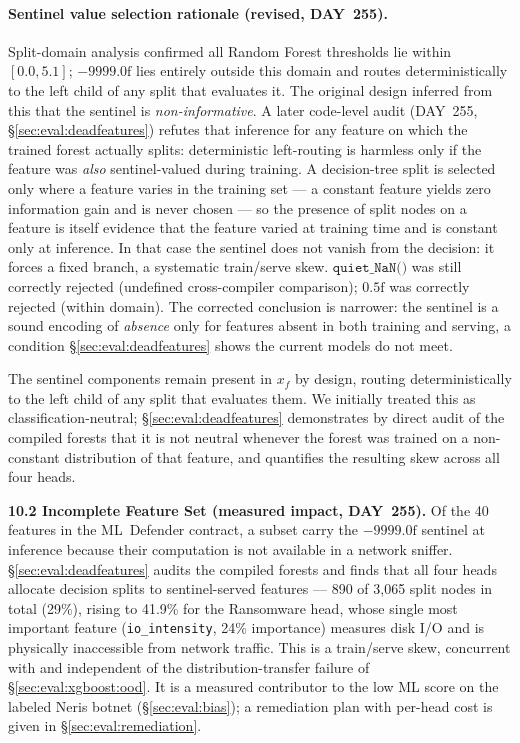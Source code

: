 \paragraph{Sentinel value selection rationale (revised, DAY~255).}
Split-domain analysis confirmed all Random Forest thresholds lie within
$[0.0, 5.1]$; $-9999.0\text{f}$ lies entirely outside this domain and routes
deterministically to the left child of any split that evaluates it. The
original design inferred from this that the sentinel is \emph{non-informative}.
A later code-level audit (DAY~255, \S\ref{sec:eval:deadfeatures}) refutes that
inference for any feature on which the trained forest actually splits:
deterministic left-routing is harmless only if the feature was \emph{also}
sentinel-valued during training. A decision-tree split is selected only where a
feature varies in the training set --- a constant feature yields zero
information gain and is never chosen --- so the presence of split nodes on a
feature is itself evidence that the feature varied at training time and is
constant only at inference. In that case the sentinel does not vanish from the
decision: it forces a fixed branch, a systematic train/serve skew.
$\texttt{quiet\_NaN()}$ was still correctly rejected (undefined cross-compiler
comparison); $0.5\text{f}$ was correctly rejected (within domain). The corrected
conclusion is narrower: the sentinel is a sound encoding of \emph{absence} only
for features absent in both training and serving, a condition
\S\ref{sec:eval:deadfeatures} shows the current models do not meet.

The sentinel components remain present in $x_f$ by design, routing
deterministically to the left child of any split that evaluates them. We
initially treated this as classification-neutral; \S\ref{sec:eval:deadfeatures}
demonstrates by direct audit of the compiled forests that it is not neutral
whenever the forest was trained on a non-constant distribution of that feature,
and quantifies the resulting skew across all four heads.

\textbf{10.2 Incomplete Feature Set (measured impact, DAY~255).}
Of the 40 features in the ML~Defender contract, a subset carry the
$-9999.0\text{f}$ sentinel at inference because their computation is not
available in a network sniffer. \S\ref{sec:eval:deadfeatures} audits the
compiled forests and finds that all four heads allocate decision splits to
sentinel-served features --- 890 of 3{,}065 split nodes in total (29\%), rising
to 41.9\% for the Ransomware head, whose single most important feature
(\texttt{io\_intensity}, 24\% importance) measures disk I/O and is physically
inaccessible from network traffic. This is a train/serve skew, concurrent with
and independent of the distribution-transfer failure of
\S\ref{sec:eval:xgboost:ood}. It is a measured contributor to the low ML score
on the labeled Neris botnet (\S\ref{sec:eval:bias}); a remediation plan with
per-head cost is given in \S\ref{sec:eval:remediation}.


